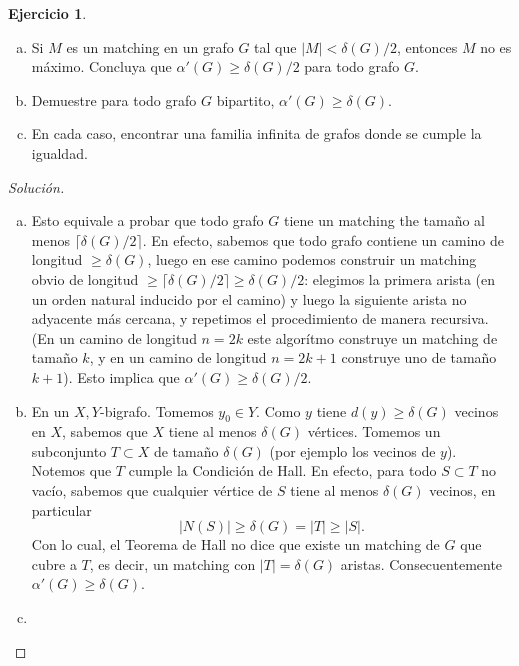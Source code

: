 \documentclass[12pt]{report}
\theoremstyle{plain}
\theoremstyle{definition}
\newtheorem{exercise}[theorem]{Ejercicio}
\newenvironment{solution}{\begin{proof}[Solución]}{\end{proof}}
\newcommand{\abs}[1]{\left \vert #1 \right \vert}
\begin{document}
\begin{exercise}
\begin{enumerate}[(a)]
\item Si $M$ es un matching en un grafo $G$ tal que $\abs M < \delta (G) / 2$, entonces $M$ no es máximo. Concluya que $\alpha ' (G) \geq \delta (G)/2$ para todo grafo $G$.
\item Demuestre para todo grafo $G$ bipartito, $\alpha ' (G) \geq \delta (G)$.
\item En cada caso, encontrar una familia infinita de grafos donde se cumple la igualdad.
\end{enumerate}
\end{exercise}
\begin{solution}
\begin{enumerate}[(a)]
\item Esto equivale a probar que todo grafo $G$ tiene un matching the tamaño al menos $\lceil \delta (G)/2 \rceil$. En efecto, sabemos que todo grafo contiene un camino de longitud $\geq \delta (G)$, luego en ese camino podemos construir un matching obvio de longitud $\geq \lceil \delta (G) /2 \rceil \geq \delta (G)/2$: elegimos la primera arista (en un orden natural inducido por el camino) y luego la siguiente arista no adyacente más cercana, y repetimos el procedimiento de manera recursiva. (En un camino de longitud $n = 2k$ este algorítmo construye un matching de tamaño $k$, y en un camino de longitud $n = 2k +1$ construye uno de tamaño $k+1$). Esto implica que $\alpha ' (G) \geq \delta (G) /2$.
\item En un $X,Y$-bigrafo. Tomemos $y_0 \in Y$. Como $y$ tiene $d(y) \geq \delta (G)$ vecinos en $X$, sabemos que $X$ tiene al menos $\delta (G)$ vértices. Tomemos un subconjunto $T \subset X$ de tamaño $\delta (G)$ (por ejemplo los vecinos de $y$). Notemos que $T$ cumple la Condición de Hall. En efecto, para todo $S \subset T$ no vacío, sabemos que cualquier vértice de $S$ tiene al menos $\delta (G)$ vecinos, en particular
$$\abs {N(S)} \geq \delta (G) = \abs T \geq \abs S .$$
Con lo cual, el Teorema de Hall no dice que existe un matching de $G$ que cubre a $T$, es decir, un matching con $\abs T = \delta (G)$ aristas. Consecuentemente $\alpha ' (G) \geq \delta (G)$.
\item
    \begin{enumerate}[(a)]

\end{enumerate}
\end{enumerate}
\end{solution}
\end{document}
